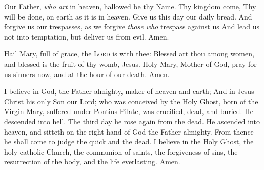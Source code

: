 \documentclass{article}
\begin{document}

\begin{prayer}

  Our Father, \textit{who art} in heaven,
    hallowed be thy Name.
    Thy kingdom come,
    Thy will be done,
      on earth as it is in heaven.
  Give us this day our daily bread.
  And forgive us our trespasses,
    as we forgive \textit{those who} trespass against us
  And lead us not into temptation,
    but deliver us from evil. Amen.
    
\end{prayer}





\begin{prayer}

  Hail Mary, full of grace, the \textsc{Lord} is with thee:
  Blessed art thou among women,
    and blessed is the fruit of thy womb, Jesus.
  Holy Mary, Mother of God, 
    pray for us sinners now, 
    and at the hour of our death. Amen.
    
\end{prayer}


\begin{prayer}

  I believe in God, the Father almighty,
    maker of heaven and earth;
  And in Jesus Christ his only Son our Lord;
    who was conceived by the Holy Ghost,
    born of the Virgin Mary,
    suffered under Pontius Pilate,
    was crucified, dead, and buried.
    He descended into hell.
  The third day he rose again from the dead.
    He ascended into heaven,
    and sitteth on the right hand of God the Father almighty.
    From thence he shall come to judge the quick and the dead.
  I believe in the Holy Ghost,
    the holy catholic Church,
    the communion of saints,
    the forgiveness of sins,
    the resurrection of the body,
    and \cross the life everlasting. Amen.
    
\end{prayer}
\end{document}
